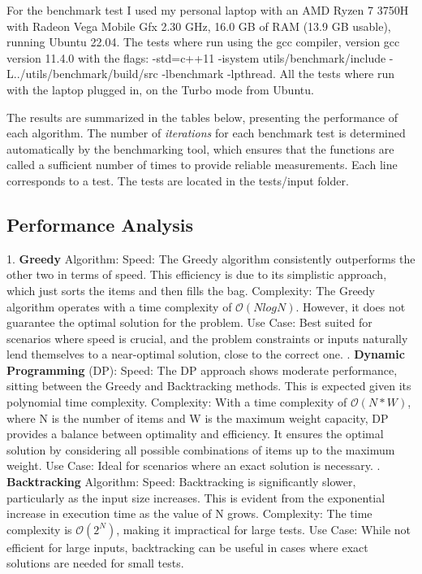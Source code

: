 \documentclass[runningheads]{llncs}
\begin{document}
For the benchmark test I used my personal laptop with an AMD Ryzen 7 3750H with Radeon Vega Mobile
Gfx 2.30 GHz, 16.0 GB of RAM (13.9 GB usable), running Ubuntu 22.04. The tests where run using the
gcc compiler, version gcc version 11.4.0 with the flags: -std=c++11 -isystem utils/benchmark/include 
-L../utils/benchmark/build/src -lbenchmark -lpthread. All the tests where run with the laptop plugged
in, on the Turbo mode from Ubuntu.

The results are summarized in the tables below, presenting the performance of each algorithm. The 
number of \textit{iterations} for each benchmark test is determined automatically by the 
benchmarking tool, which ensures that the functions are called a sufficient number of times to 
provide reliable measurements. Each line corresponds to a test. The tests are located in the tests/input folder.

\subsection{Performance Analysis}
1. \textbf{Greedy} Algorithm:
Speed: The Greedy algorithm consistently outperforms the other two in terms of speed. This
efficiency is due to its simplistic approach, which just sorts the items and then fills the bag.
Complexity: The Greedy algorithm operates with a time complexity of $\mathcal{O}(NlogN)$. However, it does not guarantee the optimal solution for the problem.
Use Case: Best suited for scenarios where speed is crucial, and the problem constraints or inputs 
naturally lend themselves to a near-optimal solution, close to the correct one.
. \textbf{Dynamic Programming} (DP):
Speed: The DP approach shows moderate performance, sitting between the Greedy and Backtracking 
methods. This is expected given its polynomial time complexity.
Complexity: With a time complexity of $\mathcal{O}(N*W)$,  where N is the number of items and 
W is the maximum weight capacity, DP provides a balance between optimality and efficiency. It 
ensures the optimal solution by considering all possible combinations of items up to the maximum
weight.
Use Case: Ideal for scenarios where an exact solution is necessary.
. \textbf{Backtracking} Algorithm:
Speed: Backtracking is significantly slower, particularly as the input size increases. This is
evident from the exponential increase in execution time as the value of N grows.
Complexity: The time complexity is $\mathcal{O}(2^N)$, making it impractical for large tests.
Use Case: While not efficient for large inputs, backtracking can be useful in cases where exact 
solutions are needed for small tests.
\end{document}

